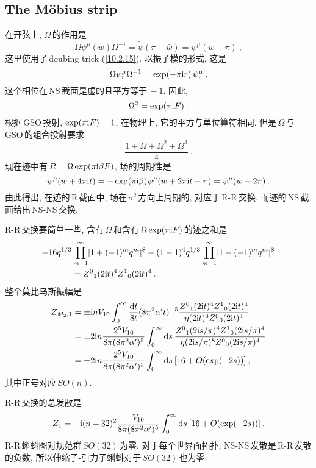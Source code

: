\subsection*{The M\"{o}bius strip}

在开弦上, $\Omega\,$的作用是
\begin{equation}
    \Omega\psi^{\mu}(w)\Omega^{-1} =\tilde{\psi}(\pi-\bar{w})=\psi^{\mu}(w-\pi) \:,\label{10.8.12}
\end{equation}
这里使用了\,doubing trick (\ref{10.2.15}). 以振子模的形式, 这是
\begin{equation}
    \Omega \psi^{\mu}_{r} \Omega^{-1} =\exp(-\pi\mathrm{i} r) \,\psi_{r}^{\mu} \:. \label{10.8.13}
\end{equation}
这个相位在\,NS\,截面是虚的且平方等于$\,-1$. 因此,
\begin{equation}
    \Omega^{2} =\exp(\pi\mathrm{i} F) \:. \label{10.8.14}
\end{equation}
根据\,GSO\,投射, $\exp(\pi\mathrm{i} F)=1$, 在物理上, 它的平方与单位算符相同, 但是$\,\Omega\,$与\,GSO\,的组合投射要求
\begin{equation}
    \frac{1+\Omega +\Omega^{2}+\Omega^{3}}{4} \:. \label{10.8.15}
\end{equation}
现在迹中有$\,R=\Omega \exp(\pi\mathrm{i}\beta F)$, 场的周期性是
\begin{equation}
    \psi^{\mu}(w+4\pi\mathrm{i} t) = -\exp(\pi\mathrm{i}\beta)\psi^{\mu}(w+2\pi\mathrm{i} t-\pi) =\psi^{\mu}(w-2\pi) \:. \label{10.8.16}
\end{equation}
由此得出, 在迹的\,R\,截面中, 场在$\,\sigma^{2}\,$方向上周期的, 对应于\,R-R\,交换, 而迹的\,NS\,截面给出\,NS-NS\,交换.

R-R\,交换要简单一些, 含有$\,\Omega\,$和含有$\,\Omega\exp(\pi\mathrm{i} F)\,$的迹之和是
\begin{align}
    -16q^{1/3}&\prod_{m=1}^{\infty} [1+(-1)^{m}q^{m}]^{8} 
    -(1-1)^{4}q^{1/3}\prod_{m=1}^{\infty} [1-(-1)^{m}q^{m}]^{8} \nonumber \\
    &= Z^{0}{}_{1}(2\mathrm{i} t)^{4} Z^{1}{}_{0}(2\mathrm{i} t)^{4} \:. \label{10.8.17}
\end{align}
整个莫比乌斯振幅是
\begin{align}
    Z_{M_{2},1}&=\pm\mathrm{i} n V_{10} \int_{0}^{\infty} \frac{\mathrm{d} t}{8t}(8\pi^{2}\alpha^{\prime}t)^{-5}
    \frac{Z^{0}{}_{1}(2\mathrm{i} t)^{4}Z^{1}{}_{0}(2\mathrm{i} t)^{4}}{\eta(2\mathrm{i} t)^{8}Z^{0}{}_{0}(2\mathrm{i} t)^{4}}\nonumber \\
    &=\pm 2\mathrm{i} n \frac{2^{5}V_{10}}{8\pi(8\pi^{2}\alpha^{\prime})^{5}}\int_{0}^{\infty}\mathrm{d} s \:
    \frac{Z^{0}{}_{1}(2\mathrm{i} s/\pi)^{4}Z^{1}{}_{0}(2\mathrm{i} s/\pi)^{4}}{\eta(2\mathrm{i} s/\pi)^{8}Z^{0}{}_{0}(2\mathrm{i} s/\pi)^{4}}\nonumber \\
    &=\pm 2\mathrm{i} n \frac{2^{5}V_{10}}{8\pi(8\pi^{2}\alpha^{\prime})^{5}}\int_{0}^{\infty}\mathrm{d} s \:
    [16+O(\exp(-2s))] \:, \label{10.8.18}
\end{align}
其中正号对应$\,SO(n)$.

R-R\,交换的总发散是
\begin{equation}
    Z_{1} = -\mathrm{i}(n\mp 32)^{2} \frac{V_{10}}{8\pi (8\pi^{2}\alpha^{\prime})^{5}}
    \int^{\infty}_{0}\mathrm{d} s \:[16+O(\exp(-2s))] \:. \label{10.8.19}
\end{equation}
R-R\,蝌蚪图对规范群$\,SO(32)\,$为零. 对于每个世界面拓扑, NS-NS\,发散是\,R-R\,发散的负数, 所以伸缩子-引力子蝌蚪对于$\,SO(32)\,$也为零.
